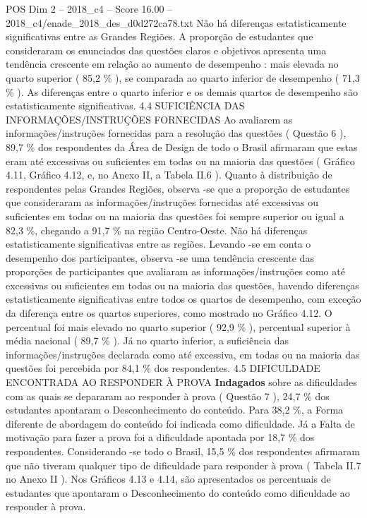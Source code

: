 \begin{textsample}{POS Dim 2 – 2018\_c4 – Score 16.00 – 2018\_c4/enade\_2018\_des\_d0d272ca78.txt}
Não há diferenças estatisticamente significativas entre as Grandes Regiões.
A proporção de estudantes que consideraram os enunciados das questões claros e objetivos apresenta uma tendência crescente em relação ao aumento de desempenho : mais elevada no quarto superior ( 85,2 \% ), se comparada ao quarto inferior de desempenho ( 71,3 \% ).
As diferenças entre o quarto inferior e os demais quartos de desempenho são estatisticamente significativas. 4.4 SUFICIÊNCIA DAS INFORMAÇÕES/INSTRUÇÕES FORNECIDAS Ao avaliarem as informações/instruções fornecidas para a resolução das questões ( Questão 6 ), 89,7 \% dos respondentes da Área de Design de todo o Brasil afirmaram que estas eram até excessivas ou suficientes em todas ou na maioria das questões ( Gráfico 4.11, Gráfico 4.12, e, no Anexo II, a Tabela II.6 ).
Quanto à distribuição de respondentes pelas Grandes Regiões, observa -se que a proporção de estudantes que consideraram as informações/instruções fornecidas até excessivas ou suficientes em todas ou na maioria das questões foi sempre superior ou igual a 82,3 \%, chegando a 91,7 \% na região Centro-Oeste.
Não há diferenças estatisticamente significativas entre as regiões.
Levando -se em conta o desempenho dos participantes, observa -se uma tendência crescente das proporções de participantes que avaliaram as informações/instruções como até excessivas ou suficientes em todas ou na maioria das questões, havendo diferenças estatisticamente significativas entre todos os quartos de desempenho, com exceção da diferença entre os quartos superiores, como mostrado no Gráfico 4.12.
O percentual foi mais elevado no quarto superior ( 92,9 \% ), percentual superior à média nacional ( 89,7 \% ).
Já no quarto inferior, a suficiência das informações/instruções declarada como até excessiva, em todas ou na maioria das questões foi percebida por 84,1 \% dos respondentes. 4.5 DIFICULDADE ENCONTRADA AO RESPONDER À PROVA \textbf{Indagados} sobre as dificuldades com as quais se depararam ao responder à prova ( Questão 7 ), 24,7 \% dos estudantes apontaram o Desconhecimento do conteúdo.
Para 38,2 \%, a Forma diferente de abordagem do conteúdo foi indicada como dificuldade.
Já a Falta de motivação para fazer a prova foi a dificuldade apontada por 18,7 \% dos respondentes.
Considerando -se todo o Brasil, 15,5 \% dos respondentes afirmaram que não tiveram qualquer tipo de dificuldade para responder à prova ( Tabela II.7 no Anexo II ).
Nos Gráficos 4.13 e 4.14, são apresentados os percentuais de estudantes que apontaram o Desconhecimento do conteúdo como dificuldade ao responder à prova.

\end{textsample}
